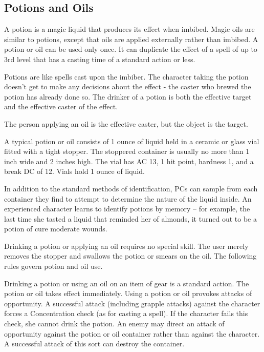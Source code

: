 \subsection{Potions and Oils}

A potion is a magic liquid that produces its effect when imbibed. Magic oils are similar to potions, except that oils are applied externally rather than imbibed. A potion or oil can be used only once. It can duplicate the effect of a spell of up to 3rd level that has a casting time of a standard action or less.

Potions are like spells cast upon the imbiber. The character taking the potion doesn't get to make any decisions about the effect  - the caster who brewed the potion has already done so. The drinker of a potion is both the effective target and the effective caster of the effect.

The person applying an oil is the effective caster, but the object is the target.

 A typical potion or oil consists of 1 ounce of liquid held in a ceramic or glass vial fitted with a tight stopper. The stoppered container is usually no more than 1 inch wide and 2 inches high. The vial has AC 13, 1 hit point, hardness 1, and a break DC of 12. Vials hold 1 ounce of liquid.

 In addition to the standard methods of identification, PCs can sample from each container they find to attempt to determine the nature of the liquid inside. An experienced character learns to identify potions by memory -- for example, the last time she tasted a liquid that reminded her of almonds, it turned out to be a potion of cure moderate wounds.

 Drinking a potion or applying an oil requires no special skill. The user merely removes the stopper and swallows the potion or smears on the oil. The following rules govern potion and oil use.

Drinking a potion or using an oil on an item of gear is a standard action. The potion or oil takes effect immediately. Using a potion or oil provokes attacks of opportunity. A successful attack (including grapple attacks) against the character forces a Concentration check (as for casting a spell). If the character fails this check, she cannot drink the potion. An enemy may direct an attack of opportunity against the potion or oil container rather than against the character. A successful attack of this sort can destroy the container.

